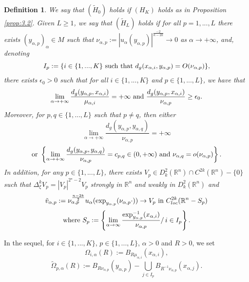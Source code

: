 \documentclass[reqno]{amsart}
\newtheorem{defi}{Definition}[section]
\def \rn {\mathbb{R}^n}
\def \eps {\epsilon}
\def \crit {2^\star}
\def \ua {u_\alpha}
\def \xai {x_{\alpha,i}}
\def \mai {\mu_{\alpha,i}}
\def \xaj {x_{\alpha,j}}
\def \tvap {\tilde{v}_{\alpha,p}}
\def \nap {\nu_{\alpha,p}}
\def \naq {\nu_{\alpha,q}}
\def \yap {y_{\alpha,p}}
\def \yaq {y_{\alpha,q}}
\begin{document}
\begin{defi} We say that $(\tilde{H}_{0})$ holds if $(H_K)$ holds as in Proposition \ref{prop:3.2}. Given $L\geq 1$, we say that $(\tilde{H}_{L})$ holds if for all $p=1,...,L$ there exists $(\yap)_\alpha\in M$ such that $\nap:=|\ua(\yap)|^{\frac{-2}{n-2k}}\to 0$ as  $\alpha\to +\infty$, and, denoting
$$I_p:=\{i\in\{1,...,K\}\hbox{ such that }d_g(\xai,\yap)=O(\nap)\},$$
there exists $\eps_0>0$ such that for all $i\in\{1,...,K\}$ and $p\in\{1,...,L\}$, we have that
\begin{equation}\label{ineq:dist:xai:yap}
\lim_{\alpha\to+\infty}\frac{d_g(\yap,\xai)}{\mai}=+\infty\hbox{ and }\frac{d_g(\yap,\xai)}{\nap}\geq\eps_0.
\end{equation}
Moreover, for $p,q\in \{1,...,L\}$ such that $p\neq q$, then
either 
\begin{equation}\label{ineq:dist:yap:yaq:1}
\lim_{\alpha\to +\infty}\frac{d_g(\yap,\yaq)}{\nap}=+\infty
\end{equation} 
\begin{equation}\label{ineq:dist:xai:yap:yaq:2}
\hbox{or }\left\{\lim_{\alpha\to +\infty}\frac{d_g(\yap,\yaq)}{\nap}=c_{p,q}\in (0,+\infty)\hbox{ and }\naq=o(\nap)\right\}.
\end{equation}
In addition, for any $p\in \{1,...,L\}$, there exists $V_p\in D_k^2(\rn)\cap C^{2k}(\rn)-\{0\}$ such that $\Delta_\xi^k V_p=|V_p|^{\crit-2}V_p$ strongly in $\rn$ and weakly in $D_k^2(\rn)$ and
\begin{equation}\label{cv:tvap}
\tvap :=\nap^{\frac{n-2k}{2}}\ua(\hbox{exp}_{\yap}(\nap \cdot))\to V_p\hbox{ in }C^{2k}_{loc}(\rn-S_p)
\end{equation} 
\begin{equation}\label{def:Sp}
\hbox{where }S_p:=\left\{\lim_{\alpha\to \infty}\frac{\hbox{exp}_{\yap}^{-1}(\xai)}{\nap}/\, i\in I_p\right\}.
\end{equation}
\end{defi}
In the sequel, for $i\in \{1,...,K\}$, $p\in\{1,...,L\}$, $\alpha>0$ and $R>0$, we set
$$\Omega_{i,\alpha}(R):=B_{R\mai}(\xai), $$
$$\tilde{\Omega}_{p,\alpha}(R):= B_{R\nap}(\yap)-\bigcup_{j\in I_p}B_{R^{-1}\nap}(\xaj).$$
\end{document}
